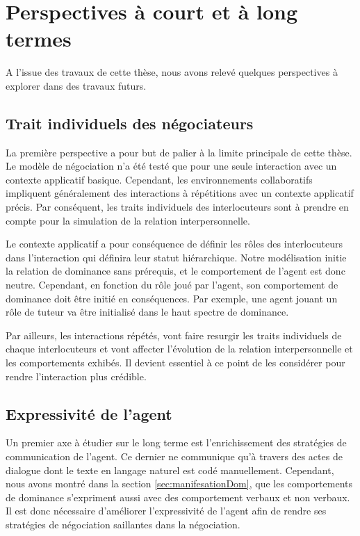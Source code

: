 \section{Perspectives à court et à long termes}

	A l’issue des travaux de cette thèse, nous avons relevé quelques perspectives à explorer dans des travaux futurs.		
	
	\subsection{Trait individuels des négociateurs}
		La première perspective a pour but de palier à la limite principale de cette thèse. Le modèle de négociation n'a été testé que pour une seule interaction avec un contexte applicatif basique. Cependant, les environnements collaboratifs impliquent généralement des interactions à répétitions avec un contexte applicatif précis. Par conséquent, les traits individuels des interlocuteurs sont à prendre en compte pour la simulation de la relation interpersonnelle. 
		
		Le contexte applicatif a pour conséquence de définir les rôles des interlocuteurs dans l'interaction qui définira leur statut hiérarchique. Notre modélisation initie la relation de dominance sans prérequis, et le comportement de l'agent est donc neutre. Cependant, en fonction du rôle joué par l'agent, son comportement de dominance doit être initié en conséquences. Par exemple, une agent jouant un rôle de tuteur va être initialisé dans le haut spectre de dominance. 
		
		Par ailleurs, les interactions répétés, vont faire resurgir les traits individuels de chaque interlocuteurs et vont affecter l'évolution de la relation interpersonnelle et les comportements exhibés. Il devient essentiel à ce point de les considérer pour rendre l'interaction plus crédible.	
	
	\subsection{Expressivité de l'agent}
		Un premier axe à étudier sur le long terme est l'enrichissement des stratégies de communication de l'agent. Ce dernier ne communique qu'à travers des actes de dialogue dont le texte en langage naturel est codé manuellement. Cependant, nous avons montré dans la section \ref{sec:manifesationDom}, que les comportements de dominance s'expriment aussi avec des comportement verbaux et non verbaux.
		Il est donc nécessaire d'améliorer l'expressivité de l'agent afin de rendre ses stratégies de négociation saillantes dans la négociation. 
	
